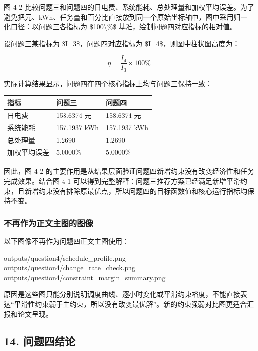 \documentclass[
]{article}
\newenvironment{Shaded}{}{}
\newcommand{\NormalTok}[1]{#1}
\begin{document}
图 4-2
比较问题三和问题四的日电费、系统能耗、总处理量和加权平均误差。为了避免把元、kWh、任务量和百分比直接放到同一个原始坐标轴中，图中采用归一化口径：以问题三各指标为
\$100\textbackslash\%\$ 基准，绘制问题四对应指标的相对值。

设问题三某指标为 \$I\_3\$，问题四对应指标为
\$I\_4\$，则图中柱状图高度为：

\[\eta=\frac{I_4}{I_3}\times 100\%\]

实际计算结果显示，问题四在四个核心指标上均与问题三保持一致：

\begin{longtable}[]{@{}lll@{}}
\toprule\noalign{}
指标 & 问题三 & 问题四 \\
\midrule\noalign{}
\endhead
\bottomrule\noalign{}
\endlastfoot
日电费 & 158.6374 元 & 158.6374 元 \\
系统能耗 & 157.1937 kWh & 157.1937 kWh \\
总处理量 & 1.2690 & 1.2690 \\
加权平均误差 & 5.0000\% & 5.0000\% \\
\end{longtable}

因此，图 4-2
的主要作用是从结果层面验证问题四新增约束没有改变经济性和任务完成效果。结合图
4-1
可以得到完整解释：问题三推荐方案已经满足新增平滑约束，且新增约束没有排除原最优点，所以问题四的目标函数值和核心运行指标均保持不变。

\subsubsection{不再作为正文主图的图像}\label{ux4e0dux518dux4f5cux4e3aux6b63ux6587ux4e3bux56feux7684ux56feux50cf}

以下图像不再作为问题四正文主图使用：

\begin{Shaded}
\begin{Highlighting}[]
\NormalTok{outputs/question4/schedule\_profile.png}
\NormalTok{outputs/question4/change\_rate\_check.png}
\NormalTok{outputs/question4/constraint\_margin\_summary.png}
\end{Highlighting}
\end{Shaded}

原因是这些图只能分别说明调度曲线、逐小时变化或平滑约束裕度，不能直接表达``平滑性约束弱于主约束，所以没有改变最优解''。新的约束强弱对比图更适合汇报和论文呈现。

\subsection{14. 问题四结论}\label{14-ux95eeux9898ux56dbux7ed3ux8bba}
\end{document}
